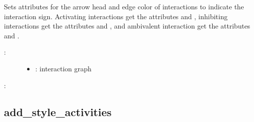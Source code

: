 \documentclass[letterpaper,10pt,english]{sphinxmanual}
\begin{document}
\begin{fulllineitems}
\label{\detokenize{InteractionGraphs:PyBoolNet.InteractionGraphs.add_style_interactionsigns}}
Sets attributes for the arrow head and edge color of interactions to indicate the interaction sign.
Activating interactions get the attributes  and ,
inhibiting interactions get the attributes  and , and
ambivalent interaction get the attributes  and .
\begin{description}
\item[{:}] \leavevmode\begin{itemize}
\item {} 
: interaction graph

\end{itemize}

\end{description}

:

\begin{sphinxVerbatim}[commandchars=\\\{\}]
\end{sphinxVerbatim}

\end{fulllineitems}



\subsection{add\_style\_activities}
\label{\detokenize{InteractionGraphs:id10}}\label{\detokenize{InteractionGraphs:add-style-activities}}
\end{document}
